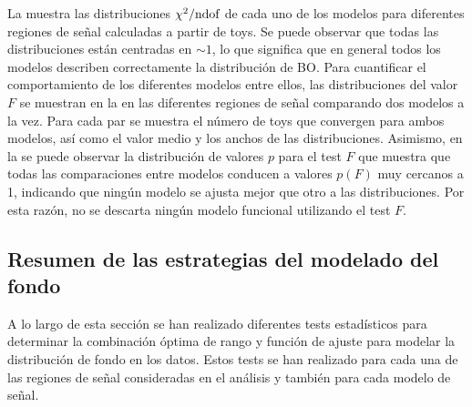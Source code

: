 La \Fig{\ref{fig:bkg:modeling:preparation:ftest:chi2ndof}} muestra las distribuciones \(\chi^{2} / \text{ndof}\) de cada uno de los modelos para diferentes regiones de señal calculadas a partir de toys. Se puede observar que todas las distribuciones están centradas en \(\sim 1\), lo que significa que en general todos los modelos describen correctamente la distribución de \ac{BO}. Para cuantificar el comportamiento de los diferentes modelos entre ellos, las distribuciones del valor \(F\) se muestran en la \Fig{\ref{fig:bkg:modeling:preparation:ftest:ftest}} en las diferentes regiones de señal comparando dos modelos a la vez. Para cada par se muestra el número de toys que convergen para ambos modelos, así como el valor medio y los anchos de las distribuciones. Asimismo, en la \Fig{\ref{fig:bkg:modeling:preparation:ftest:ftest_pvalue}} se puede observar la distribución de valores \(p\) para el test \(F\) que muestra que todas las comparaciones entre modelos conducen a valores \(p(F)\) muy cercanos a 1, indicando que ningún modelo se ajusta mejor que otro a las distribuciones. Por esta razón, no se descarta ningún modelo funcional utilizando el test \(F\).





































\subsection{Resumen de las estrategias del modelado del fondo}
\label{subsec:bkg:modeling:strategy_summary}

A lo largo de esta sección se han realizado diferentes tests estadísticos para determinar la combinación óptima de rango y función de ajuste para modelar la distribución de fondo en los datos. Estos tests se han realizado para cada una de las regiones de señal consideradas en el análisis y también para cada modelo de señal.

